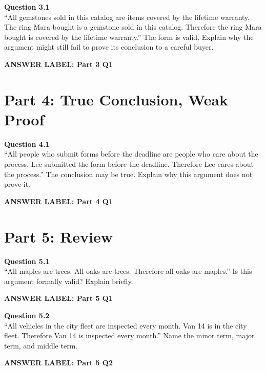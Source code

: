 \documentclass[12pt]{article}
\newcommand{\answerbox}[2]{%
\vspace{0.15em}
\noindent\textbf{#1}\par
\vspace{0.05em}
\noindent\fbox{%
\begin{minipage}[t][#2]{\dimexpr\textwidth-2\fboxsep-2\fboxrule}
\rule{\textwidth}{0pt}
\vspace{#2}
\end{minipage}
}\par
\vspace{0.25em}
}
\begin{document}
\textbf{Question 3.1}\\[-0.15em]
``All gemstones sold in this catalog are items covered by the lifetime warranty. The ring Mara bought is a gemstone sold in this catalog. Therefore the ring Mara bought is covered by the lifetime warranty.'' The form is valid. Explain why the argument might still fail to prove its conclusion to a careful buyer.

\answerbox{ANSWER LABEL: Part 3 Q1}{2.45in}

\newpage

\section*{Part 4: True Conclusion, Weak Proof}

\textbf{Question 4.1}\\[-0.15em]
``All people who submit forms before the deadline are people who care about the process. Lee submitted the form before the deadline. Therefore Lee cares about the process.'' The conclusion may be true. Explain why this argument does not prove it.

\answerbox{ANSWER LABEL: Part 4 Q1}{2.45in}

\newpage

\section*{Part 5: Review}

\textbf{Question 5.1}\\[-0.15em]
``All maples are trees. All oaks are trees. Therefore all oaks are maples.'' Is this argument formally valid? Explain briefly.

\answerbox{ANSWER LABEL: Part 5 Q1}{2.15in}

\textbf{Question 5.2}\\[-0.15em]
``All vehicles in the city fleet are inspected every month. Van 14 is in the city fleet. Therefore Van 14 is inspected every month.'' Name the minor term, major term, and middle term.

\answerbox{ANSWER LABEL: Part 5 Q2}{1.85in}
\end{document}
